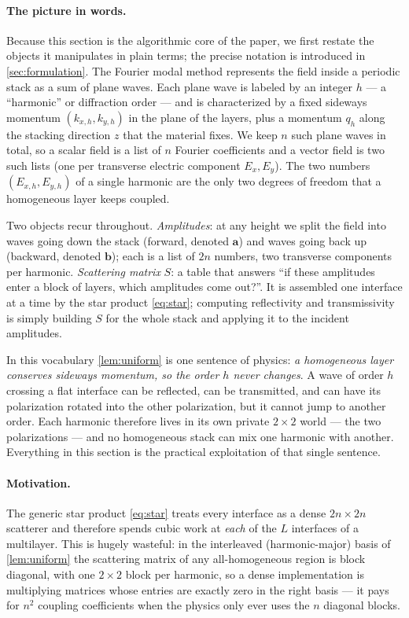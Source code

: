 \documentclass[11pt]{article}
\theoremstyle{remark}
\newcommand{\fa}{\mathbf{a}}
\newcommand{\fb}{\mathbf{b}}
\begin{document}
\paragraph{The picture in words.}
Because this section is the algorithmic core of the paper, we first restate the
objects it manipulates in plain terms; the precise notation is introduced in
\cref{sec:formulation}.  The Fourier modal method represents the field inside
a periodic stack as a sum of plane waves.  Each plane wave is labeled by an
integer $h$ --- a ``harmonic'' or diffraction order --- and is characterized by
a fixed sideways momentum $(k_{x,h},k_{y,h})$ in the plane of the layers, plus
a momentum $q_h$ along the stacking direction $z$ that the material fixes.  We
keep $n$ such plane waves in total, so a scalar field is a list of $n$ Fourier
coefficients and a vector field is two such lists (one per transverse electric
component $E_x,E_y$).  The two numbers $(E_{x,h},E_{y,h})$ of a single harmonic
are the only two degrees of freedom that a homogeneous layer keeps coupled.

Two objects recur throughout.  \emph{Amplitudes}: at any height we split the
field into waves going down the stack (forward, denoted $\fa$) and waves going
back up (backward, denoted $\fb$); each is a list of $2n$ numbers, two
transverse components per harmonic.  \emph{Scattering matrix} $S$: a table that
answers ``if these amplitudes enter a block of layers, which amplitudes come
out?''.  It is assembled one interface at a time by the star product
\eqref{eq:star}; computing reflectivity and transmissivity is simply building
$S$ for the whole stack and applying it to the incident amplitudes.

In this vocabulary \cref{lem:uniform} is one sentence of physics: \emph{a
homogeneous layer conserves sideways momentum, so the order $h$ never
changes}.  A wave of order $h$ crossing a flat interface can be reflected, can
be transmitted, and can have its polarization rotated into the other
polarization, but it cannot jump to another order.  Each harmonic therefore
lives in its own private $2\times2$ world --- the two polarizations --- and no
homogeneous stack can mix one harmonic with another.  Everything in this
section is the practical exploitation of that single sentence.

\paragraph{Motivation.}
The generic star product \eqref{eq:star} treats every interface as a dense
$2n\times2n$ scatterer and therefore spends cubic work at \emph{each} of the
$L$ interfaces of a multilayer.  This is hugely wasteful: in the interleaved
(harmonic-major) basis of \cref{lem:uniform} the scattering matrix of any
all-homogeneous region is block diagonal, with one $2\times2$ block per
harmonic, so a dense implementation is multiplying matrices whose entries are
exactly zero in the right basis --- it pays for $n^2$ coupling coefficients
when the physics only ever uses the $n$ diagonal blocks.
\end{document}
